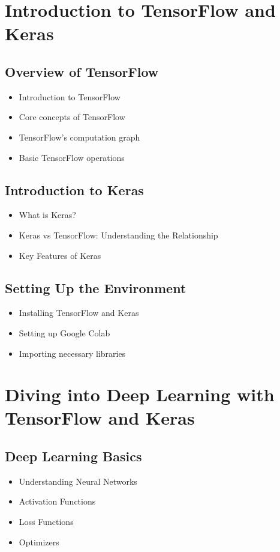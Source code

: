 \documentclass[a4paper,12pt]{book}
\begin{document}

\chapter{Introduction to TensorFlow and Keras}

\section{Overview of TensorFlow}
\begin{itemize}
    \item Introduction to TensorFlow
    \item Core concepts of TensorFlow
    \item TensorFlow's computation graph
    \item Basic TensorFlow operations
\end{itemize}

\section{Introduction to Keras}
\begin{itemize}
    \item What is Keras?
    \item Keras vs TensorFlow: Understanding the Relationship
    \item Key Features of Keras
\end{itemize}

\section{Setting Up the Environment}
\begin{itemize}
    \item Installing TensorFlow and Keras
    \item Setting up Google Colab
    \item Importing necessary libraries
\end{itemize}

\chapter{Diving into Deep Learning with TensorFlow and Keras}

\section{Deep Learning Basics}
\begin{itemize}
    \item Understanding Neural Networks
    \item Activation Functions
    \item Loss Functions
    \item Optimizers
\end{itemize}
\end{document}
